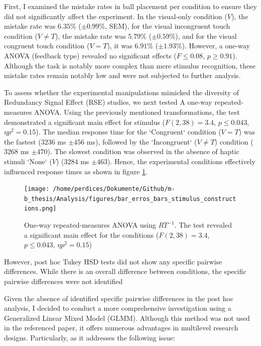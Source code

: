 \documentclass[12pt,oneside,openright]{report}
\begin{document}
First, I examined the mistake rates in ball placement per condition to ensure they did not significantly affect the experiment. In the visual-only condition ($V$), the mistake rate was $6.35\%$ ($\pm 0.99\%$, SEM), for the visual incongruent touch condition ($V \neq T$), the mistake rate was $5.79\%$ ($\pm 0.59\%$), and for the visual congruent touch condition ($V=T$), it was $6.91\%$ ($ \pm 1.93\%$). However, a one-way ANOVA (feedback type) revealed no significant effects ($ F \leq 0.08$, $p \geq 0.91$). Although the task is notably more complex than mere stimulus recognition, these mistake rates remain notably low and were not subjected to further analysis.

To assess whether the experimental manipulations mimicked the diversity of Redundancy Signal Effect (RSE)  studies, we next tested A one-way repeated-measures ANOVA. Using the previously mentioned transformations, the test demonstrated a significant main effect for stimulus ($F(2,38) = 3.4$, $p \leq 0.043$, $\eta p^2 = 0.15$). The median response time for the `Congruent` condition ($V=T$) was the fastest ($3236$ ms $\pm 456$ ms), followed by the `Incongruent` ($V \neq T$) condition ($3268$ ms $\pm 470$). The slowest condition was observed in the absence of haptic stimuli `None` ($V$) ($3284$ ms $\pm 463$). Hence, the experimental conditions effectively influenced response times as shown in figure \ref{fig:error}.

\begin{figure}[!ht]
    \centering
    \texttt{[image: /home/perdices/Dokumente/Github/m-b\_thesis/Analysis/figures/bar\_erros\_bars\_stimulus\_constructions.png]}
    \caption{One-way repeated-measures ANOVA using $RT^{-1}$. The test revealed a significant main effect for the conditions ($F(2,38) = 3.4$, $p \leq 0.043$, $\eta p^2 = 0.15$)}
    \label{fig:error}
\end{figure}

However, post hoc Tukey HSD tests did not show any specific pairwise differences. While there is an overall difference between conditions, the specific pairwise differences were not identified

Given the absence of identified specific pairwise differences in the post hoc analysis, I decided to conduct a more comprehensive investigation using a Generalized Linear Mixed Model (GLMM). Although this method was not used in the referenced paper, it offers numerous advantages in multilevel research designs. Particularly, as it addresses the following issue:
\end{document}

